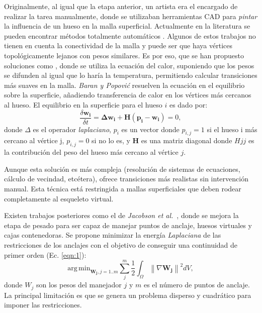Originalmente, al igual que la etapa anterior, un artista era el encargado de realizar la tarea manualmente, donde se utilizaban herramientas \ac{CAD} para \emph{pintar} la influencia de un hueso en la malla superficial. Actualmente en la literatura se pueden encontrar métodos totalmente automáticos \cite{huang2013robust,pan2017automatic}. 
Algunos de estos trabajos no tienen en cuenta la conectividad de la malla y puede ser que haya vértices topológicamente lejanos con pesos similares. Es por eso, que se han propuesto soluciones como \cite{Baran:2007}, donde se utiliza la ecuación del calor, suponiendo que los pesos se difunden al igual que lo haría la temperatura, permitiendo calcular transiciones más suaves en la malla. \emph{Baran y Popovi\'{c}} resuelven la ecuación en el equilibrio sobre la superficie, añadiendo transferencia de calor en los vértices más cercanos al hueso. El equilibrio en la superficie para el hueso $i$ es dado por:
\begin{equation}
\label{eqn:baran}
 \frac{\delta \mathbf{w_i}}{ \delta t} = \mathbf{ \Delta w_i} + \mathbf{H(p_i-w_i)} = 0,
\end{equation}
donde $\Delta$ es el operador \emph{laplaciano}, $p_i$ es un vector donde $p_{i,j}=1$ si el hueso i más cercano al vértice j, $p_{i,j}=0$ si no lo es, y $\mathbf{H}$ es una matriz diagonal donde $Hjj$ es la contribución del peso del hueso más cercano al vértice $j$.

Aunque esta solución es más compleja (resolución de sistemas de ecuaciones, cálculo de vecindad, etcétera), ofrece transiciones más realistas sin intervención manual. %
Esta técnica está restringida a mallas superficiales que deben rodear completamente al esqueleto virtual.

Existen trabajos posteriores como el de \emph{Jacobson et al.}~\cite{Jacobson:2011}, donde se mejora la etapa de pesado para ser capaz de manejar puntos de anclaje, huesos virtuales y cajas contenedoras. Se propone minimizar la energía \emph{Laplaciana} de las restricciones de los anclajes con el objetivo de conseguir una continuidad  de primer orden (Ec. \ref{eqn:1}):
\begin{equation}
\label{eqn:1}
\mathrm{arg\,min}_{\mathbf{W_j}, j=1..m}\sum_{j}^m\frac{1}{2}\int_\Omega \left \|  \nabla \mathbf{W_j}\right \|^2 dV,
\end{equation}
donde $W_j$ son los pesos del manejador $j$ y $m$ es el número de puntos de anclaje. La principal limitación es que se genera un problema disperso y cuadrático para imponer las restricciones. %


